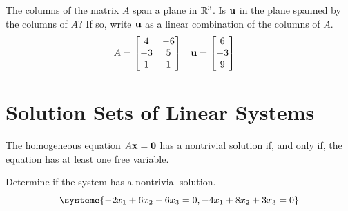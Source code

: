 \begin{exercise} %
	The columns of the matrix $A$ span a plane in $\mathbb{R}^3$. Is $\boldsymbol{\mathbf{u}}$ in the plane spanned by the columns of $A$? If so, write $\boldsymbol{\mathbf{u}}$ as a linear combination of the columns of $A$.
	\begin{align*}
	A &= \begin{bmatrix}4&-6\\-3&5\\1&1\end{bmatrix} &
	\boldsymbol{\mathbf{u}} &= \begin{bmatrix}6\\-3\\9\end{bmatrix}
	\end{align*}
\end{exercise}
\vfill


\newpage

\section{Solution Sets of Linear Systems}
\name[2in]

\begin{boxme}
	The homogeneous equation $A\boldsymbol{\mathbf{x}}=\boldsymbol{\mathbf{0}}$ has a nontrivial solution if, and only if, the equation has at least one free variable.
\end{boxme}
\begin{exercise} %
	Determine if the system has a nontrivial solution.
	$$\systeme{-2x_1+6x_2-6x_3=0,-4x_1+8x_2+3x_3=0}$$
\end{exercise}
\vfill

